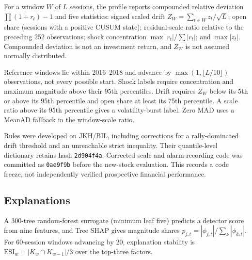 \documentclass[conference]{IEEEtran}
\begin{document}
For a window $W$ of $L$ sessions, the profile reports compounded relative deviation $\prod(1+r_t)-1$ and five statistics: signed scaled drift $Z_W=\sum_{t\in W}z_t/\sqrt{L}$; open share (sessions with a positive CUSUM state); residual-scale ratio relative to the preceding 252 observations; shock concentration $\max|r_t|/\sum|r_t|$; and $\max|z_t|$. Compounded deviation is not an investment return, and $Z_W$ is not assumed normally distributed.

Reference windows lie within 2016--2018 and advance by $\max(1,\lfloor L/10\rfloor)$ observations, not every possible start. Shock labels require concentration and maximum magnitude above their 95th percentiles. Drift requires $Z_W$ below its 5th or above its 95th percentile and open share at least its 75th percentile. A scale ratio above its 95th percentile gives a volatility-burst label. Zero MAD uses a MeanAD fallback in the window-scale ratio.

Rules were developed on JKH/BIL, including corrections for a rally-dominated drift threshold and an unreachable strict inequality. Their quantile-level dictionary retains hash \texttt{2d904f4a}. Corrected scale and alarm-recording code was committed as \texttt{0ae9f9b} before the new-stock evaluation. This records a code freeze, not independently verified prospective financial performance.

\subsection{Explanations}
A 300-tree random-forest surrogate (minimum leaf five) predicts a detector score from nine features, and Tree SHAP gives magnitude shares $p_{j,t}=|\phi_{j,t}|/\sum_k|\phi_{k,t}|$. For 60-session windows advancing by 20, explanation stability is $\mathrm{ESI}_w=|K_w\cap K_{w-1}|/3$ over the top-three factors.
\end{document}
